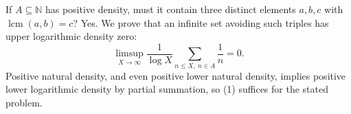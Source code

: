 If $A\subseteq\mathbb N$ has positive density, must it contain three distinct elements $a,b,c$ with $\operatorname{lcm}(a,b)=c$? Yes. We prove that an infinite set avoiding such triples has upper logarithmic density zero:
\[\limsup_{X\to\infty}\frac1{\log X}\sum_{n\le X,\ n\in A}\frac1n=0.\tag{1}\]
Positive natural density, and even positive lower natural density, implies positive lower logarithmic density by partial summation, so (1) suffices for the stated problem.
